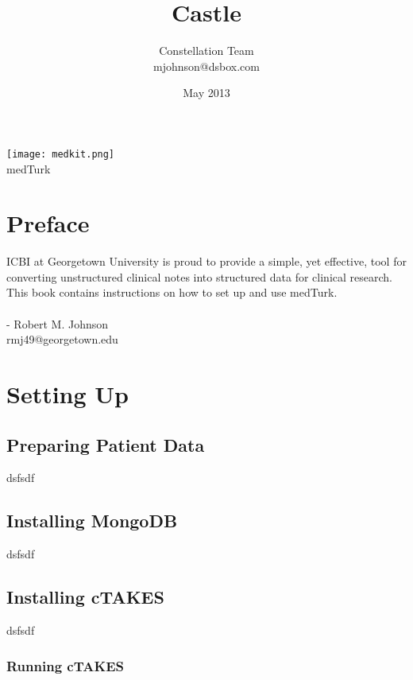 \documentclass{book}
\begin{document}
\author{Constellation Team \\ mjohnson@dsbox.com}
\title{Castle}
\date{May 2013}



\begin{titlepage}
\begin{center}

\texttt{[image: medkit.png]}~  \\[1cm]
medTurk
\end{center}
\end{titlepage}


\frontmatter


\chapter*{Preface}
ICBI at Georgetown University is proud to provide a simple, yet effective, tool for converting unstructured clinical notes into structured data for clinical research. This book contains instructions on how to set up and use medTurk.
\\
\\
- Robert M. Johnson
\\
rmj49@georgetown.edu

\tableofcontents

\mainmatter

\chapter{Setting Up}
\section{Preparing Patient Data}
dsfsdf

\section{Installing MongoDB}
dsfsdf

\section{Installing cTAKES}
dsfsdf
\subsection{Running cTAKES}
\end{document}
